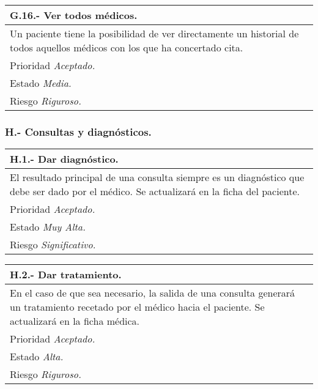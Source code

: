 \documentclass[a4paper,oneside,11pt]{book}
\begin{document}
\begin{center}
\begin{tabulary}{15cm}{|L|}
	\hline
		\bf{G.16.- Ver todos médicos.} \\
	\hline
		Un paciente tiene la posibilidad de ver directamente un historial de todos aquellos médicos con los que ha concertado cita. \\
	\hline
		Prioridad \textit{Aceptado.} \\
	\hline
		Estado \textit{Media.} \\
	\hline
		Riesgo \textit{Riguroso.} \\
	\hline
\end{tabulary}
\end{center}


\subsubsection{H.- Consultas y diagnósticos.}

\begin{center}
\begin{tabulary}{15cm}{|L|}
	\hline
		\bf{H.1.- Dar diagnóstico.} \\
	\hline
		El resultado principal de una consulta siempre es un diagnóstico que debe ser dado por el médico. Se actualizará en la ficha del paciente. \\
	\hline
		Prioridad \textit{Aceptado.} \\
	\hline
		Estado \textit{Muy Alta.} \\
	\hline
		Riesgo \textit{Significativo.} \\
	\hline
\end{tabulary}
\end{center}

\begin{center}
\begin{tabulary}{15cm}{|L|}
	\hline
		\bf{H.2.- Dar tratamiento.} \\
	\hline
		En el caso de que sea necesario, la salida de una consulta generará un tratamiento recetado por el médico hacia el paciente. Se actualizará en la ficha médica. \\
	\hline
		Prioridad \textit{Aceptado.} \\
	\hline
		Estado \textit{Alta.} \\
	\hline
		Riesgo \textit{Riguroso.} \\
	\hline
\end{tabulary}
\end{center}
\end{document}
